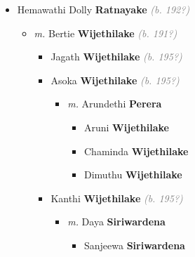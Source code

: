 \documentclass[10pt, openany]{book}
\begin{document}
\begin{itemize}
{\begin{itemize}
{\begin{itemize}
{\begin{itemize}
{ }
\item{Sucharitha \textbf{Samarakone} \textcolor{gray}{\textit{(b. 195?)}}
 }
\item{Srianee \textbf{Samarakone} \textcolor{gray}{\textit{(b. 195?)}}
 }
\item{Kusum \textbf{Samarakone} \textcolor{gray}{\textit{(b. 196?)}}
 }
\end{itemize}}
\end{itemize}
  }
\item{Hemawathi Dolly \textbf{Ratnayake} \textcolor{gray}{\textit{(b. 192?)}}
\begin{itemize}
\item{\textit{m.} Bertie \textbf{Wijethilake} \textcolor{gray}{\textit{(b. 191?)}}   \label{couple:00000649:00001020} \begin{itemize}
\item{Jagath \textbf{Wijethilake} \textcolor{gray}{\textit{(b. 195?)}}
 }
\item{Asoka \textbf{Wijethilake} \textcolor{gray}{\textit{(b. 195?)}}
\begin{itemize}
\item{\textit{m.} Arundethi \textbf{Perera} \textcolor{slorange}{\textit{}}   \label{couple:00000590:00001019} \begin{itemize}
\item{Aruni \textbf{Wijethilake} \textcolor{slorange}{\textit{}}
 }
\item{Chaminda \textbf{Wijethilake} \textcolor{slorange}{\textit{}}
 }
\item{Dimuthu \textbf{Wijethilake} \textcolor{slorange}{\textit{}}
 }
\end{itemize}}
\end{itemize}
 }
\item{Kanthi \textbf{Wijethilake} \textcolor{gray}{\textit{(b. 195?)}}
\begin{itemize}
\item{\textit{m.} Daya \textbf{Siriwardena} \textcolor{slorange}{\textit{}}   \label{couple:00000839:00001024} \begin{itemize}
\item{Sanjeewa \textbf{Siriwardena} \textcolor{slorange}{\textit{}}
}
\end{itemize}}
\end{itemize}}
\end{itemize}}
\end{itemize}}
\end{itemize}}
\end{itemize}
\end{document}
